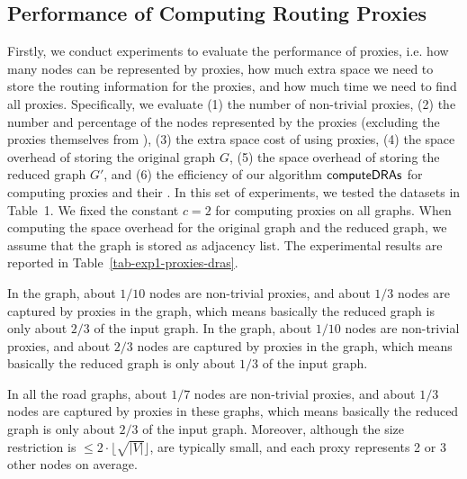 \subsection{Performance of Computing Routing Proxies}
Firstly, we conduct experiments to evaluate the performance of proxies, i.e. how many nodes can be represented by proxies, how much extra space we need to store the routing information for the proxies, and how much time we need to find all proxies. Specifically, we evaluate (1) the number of non-trivial proxies, (2) the number and percentage of the nodes represented by the proxies (excluding the proxies themselves from \dras), (3) the extra space cost of using proxies, (4) the space overhead of storing the original graph $G$, (5) the space overhead of storing the reduced graph $G'$, and (6) the efficiency of our algorithm ${\mathsf{computeDRAs}}$ for computing proxies and their \dras. In this set of experiments, we tested the datasets in Table~1. We fixed the constant $c = 2$ for computing proxies on all graphs. When computing the space overhead for the original graph and the reduced graph, we assume that the graph is stored as adjacency list. The experimental results are reported in Table~\ref{tab-exp1-proxies-dras}.

In the \dblp graph, about $1/10$ nodes are non-trivial proxies, and about $1/3$ nodes are captured by proxies in the graph, which means basically the reduced graph is only about $2/3$ of the input graph. In the \dblpone graph, about $1/10$ nodes are non-trivial proxies, and about $2/3$ nodes are captured by proxies in the graph, which means basically the reduced graph is only about $1/3$ of the input graph.




In all the road graphs,  about $1/7$ nodes are non-trivial proxies, and about $1/3$ nodes are captured by proxies in these graphs, which means basically the reduced graph is only about $2/3$ of the input graph. Moreover, although the size restriction is $\le 2\cdot\lfloor\sqrt{|V|}\rfloor$, \dras are typically small, and each proxy represents 2 or 3 other nodes on average.


